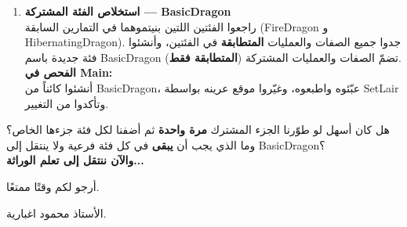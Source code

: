 \documentclass[14pt]{extarticle}
\begin{document}
\begin{enumerate}[label=\textbf{تمرين \arabic*:}, wide=0pt, leftmargin=*, itemsep=2.2em]
    \item \textbf{استخلاص الفئة المشتركة — \textenglish{BasicDragon}} \\
    راجعوا الفئتين اللتين بنيتموهما في التمارين السابقة (\textenglish{FireDragon} و \textenglish{HibernatingDragon}). جدوا جميع الصفات والعمليات \textbf{المتطابقة} في الفئتين، وأنشئوا فئة جديدة باسم \textenglish{BasicDragon} تضمّ الصفات والعمليات المشتركة (\textbf{المتطابقة فقط}). \\
    \textbf{الفحص في \textenglish{Main}:} \\
    أنشئوا كائناً من \textenglish{BasicDragon}، عبّئوه واطبعوه، وغيّروا موقع عرينه بواسطة \textenglish{SetLair} وتأكدوا من التغيير.

\end{enumerate}

\begin{boxAttention}
هل كان أسهل لو طوّرنا الجزء المشترك \textbf{مرة واحدة} ثم أضفنا لكل فئة جزءها الخاص؟ وما الذي يجب أن \textbf{يبقى} في كل فئة فرعية ولا ينتقل إلى \textenglish{BasicDragon}؟ \\
\textbf{والآن ننتقل إلى تعلم الوراثة...}
\end{boxAttention}

\vspace{1cm}
\begin{flushleft}
أرجو لكم وقتًا ممتعًا.

الأستاذ محمود اغبارية.
\end{flushleft}
\end{document}
